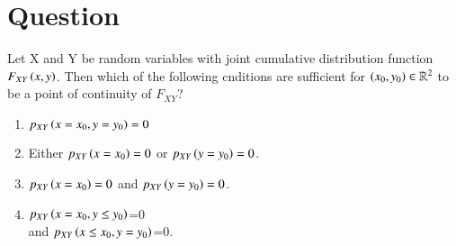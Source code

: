 \documentclass[journal,12pt,twocolumn]{IEEEtran}
\begin{document}
\section{Question}
Let X and Y be random variables with joint cumulative distribution function $F_{XY}\left(x,y\right)$. Then which of the following cnditions are sufficient for $\left(x_0,y_0\right) \in \mathbb{R}^2$ to be a point of continuity of $F_{XY}$?
\begin{enumerate}
\item $p_{XY}\left(x=x_0,y=y_0\right)=0$
\item Either $p_{XY}\left(x=x_0\right)=0$ or $p_{XY}\left(y=y_0\right)=0$.
\item $p_{XY}\left(x=x_0\right)=0$ and $p_{XY}\left(y=y_0\right)=0$.
\item $p_{XY}\left(x=x_0,y\leq y_0\right)$=0\\
 and $p_{XY}\left(x\leq x_0,y=y_0\right)$=0.
\end{enumerate}
\end{document}
